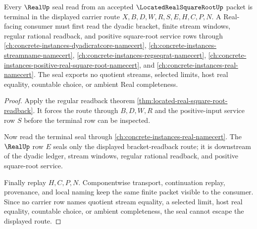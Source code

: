\begin{theorem}
\label{thm:located-real-square-root-real-seal}
Every $\RealUp$ seal read from an accepted $\LocatedRealSquareRootUp$ packet is terminal in the displayed carrier route $X,B,D,W,R,S,E,H,C,P,N$. A Real-facing consumer must first read the dyadic bracket, finite stream windows, regular rational readback, and positive square-root service rows through \autoref{ch:concrete-instances-dyadicratcore-namecert}, \autoref{ch:concrete-instances-streamname-namecert}, \autoref{ch:concrete-instances-regseqrat-namecert}, \autoref{ch:concrete-instances-positive-real-square-root-namecert}, and \autoref{ch:concrete-instances-real-namecert}. The seal exports no quotient streams, selected limits, host real equality, countable choice, or ambient Real completeness.
\end{theorem}
\begin{proof}
Apply the regular readback theorem \autoref{thm:located-real-square-root-readback}. It forces the route through $B,D,W,R$ and the positive-input service row $S$ before the terminal row can be inspected.

Now read the terminal seal through \autoref{ch:concrete-instances-real-namecert}. The $\RealUp$ row $E$ seals only the displayed bracket-readback route; it is downstream of the dyadic ledger, stream windows, regular rational readback, and positive square-root service.

Finally replay $H,C,P,N$. Componentwise transport, continuation replay, provenance, and local naming keep the same finite packet visible to the consumer. Since no carrier row names quotient stream equality, a selected limit, host real equality, countable choice, or ambient completeness, the seal cannot escape the displayed route.
\end{proof}


